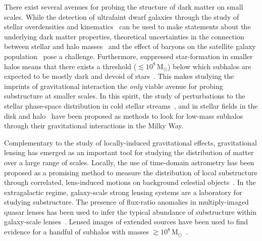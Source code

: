\documentclass[twocolumn]{aastex62}
\begin{document}
There exist several avenues for probing the structure of dark matter on small scales. While the detection of ultrafaint dwarf galaxies through the study of stellar overdensities and kinematics~\citep{1503.02584,0706.2687,1503.02079} can be used to make statements about the underlying dark matter properties, theoretical uncertainties in the connection between stellar and halo masses~\citep{1804.03097} and the effect of baryons on the satellite galaxy population~\citep{1812.00044,1811.11791,1701.03792,1608.01849} pose a challenge. Furthermore, suppressed star-formation in smaller halos means that there exists a threshold ($\lesssim 10^8\,\mathrm{M}_\odot$) below which subhalos are expected to be mostly dark and devoid of stars~\citep{1992MNRAS.256P..43E,1611.02281,1607.03127}. This makes studying the imprints of gravitational interaction the \emph{only} viable avenue for probing substructure at smaller scales. In this spirit, the study of perturbations to the stellar phase-space distribution in cold stellar streams~\citep{1804.06854,astro-ph/9807243,1109.6022,1303.4342,1811.03631}, and in stellar fields in the disk and halo~\citep{1711.03554} have been proposed as methods to look for low-mass subhalos through their gravitational interactions in the Milky Way.

Complementary to the study of locally-induced gravitational effects, gravitational lensing has emerged as an important tool for studying the distribution of matter over a large range of scales. Locally, the use of time-domain astrometry has been proposed as a promising method to measure the distribution of local substructure through correlated, lens-induced motions on background celestial objects~\citep{2018JCAP...07..041V}. In the extragalactic regime, galaxy-scale strong lensing systems are a laboratory for studying substructure. The presence of flux-ratio anomalies in multiply-imaged quasar lenses has been used to infer the typical abundance of substructure within galaxy-scale lenses~\citep{2002ApJ...572...25D,2019arXiv190504182H,2002ApJ...572...25D}. Lensed images of extended sources have been used to find evidence for a handful of subhalos with masses $\gtrsim 10^8\,\mathrm{M}_\odot$~\citep{1601.01388,0910.0760,1201.3643}.
\end{document}
